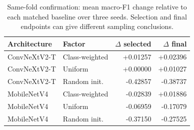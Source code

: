 \begin{table}[t]
\caption{Same-fold confirmation: mean macro-F1 change relative to each matched baseline over three seeds. Selection and final endpoints can give different sampling conclusions.}
\label{tab:confirmation}
\centering
\small
\setlength{\tabcolsep}{4pt}
\begin{tabular}{llrr}
\toprule
Architecture & Factor & $\Delta$ selected & $\Delta$ final \\
\midrule
ConvNeXtV2-T & Class-weighted & +0.01257 & +0.02396 \\
ConvNeXtV2-T & Uniform & +0.00000 & +0.01027 \\
ConvNeXtV2-T & Random init. & -0.42857 & -0.38737 \\
MobileNetV4 & Class-weighted & -0.02839 & +0.01886 \\
MobileNetV4 & Uniform & -0.06959 & -0.17079 \\
MobileNetV4 & Random init. & -0.37150 & -0.27525 \\
\bottomrule
\end{tabular}
\end{table}
